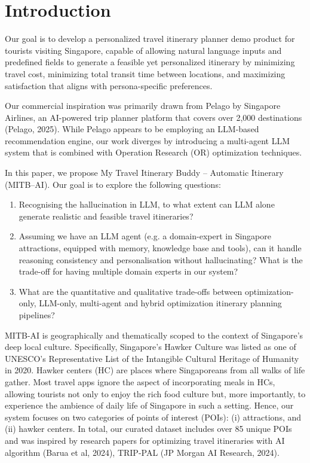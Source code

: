 \documentclass{ecai}
\begin{document}

\raggedbottom  %


\section{Introduction}
Our goal is to develop a personalized travel itinerary planner demo product for tourists visiting Singapore, capable of allowing natural language inputs and predefined fields to generate a feasible yet personalized itinerary by minimizing travel cost, minimizing total transit time between locations, and maximizing satisfaction that aligns with persona-specific preferences. 

Our commercial inspiration was primarily drawn from Pelago by Singapore Airlines, an AI-powered trip planner platform that covers over 2,000 destinations (Pelago, 2025). While Pelago appears to be employing an LLM-based recommendation engine, our work diverges by introducing a multi-agent LLM system that is combined with Operation Research (OR) optimization techniques.

In this paper, we propose My Travel Itinerary Buddy – Automatic Itinerary (MITB–AI). Our goal is to explore the following questions: 
\begin{enumerate}
    \item Recognising the hallucination in LLM, to what extent can LLM alone generate realistic and feasible travel itineraries? 
    \item Assuming we have an LLM agent (e.g. a domain-expert in Singapore attractions, equipped with memory, knowledge base and tools), can it handle reasoning consistency and personalisation without hallucinating? What is the trade-off for having multiple domain experts in our system?
    \item What are the quantitative and qualitative trade-offs between optimization-only, LLM-only, multi-agent and hybrid optimization itinerary planning pipelines?
\end{enumerate}

MITB-AI is geographically and thematically scoped to the context of Singapore's deep local culture. 
Specifically, Singapore's Hawker Culture was listed as one of UNESCO's Representative List of the Intangible Cultural Heritage of Humanity in 2020. Hawker centers (HC) are places where Singaporeans from all walks of life gather. Most travel apps ignore the aspect of incorporating meals in HCs, allowing tourists not only to enjoy the rich food culture but, more importantly, to experience the ambience of daily life of Singapore in such a setting. 
Hence, our system focuses on two categories of points of interest (POIs): (i) attractions, and (ii) hawker centers. In total, our curated dataset includes over 85 unique POIs and was inspired by research papers for optimizing travel itineraries with AI algorithm (Barua et al, 2024), TRIP-PAL (JP Morgan AI Research, 2024).
\end{document}
